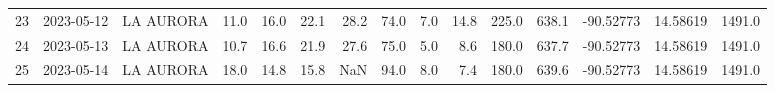 \documentclass[12pt]{article}
\begin{document}
\begin{center}
\begin{tabular}{lllrrrrrrrrrrrr}
23  & 2023-05-12 &  LA AURORA &    11.0 &  16.0 &   22.1 &  28.2 &     74.0 &  7.0 &        14.8 &       225.0 &      638.1 & -90.52773 &  14.58619 &   1491.0 \\
24  & 2023-05-13 &  LA AURORA &    10.7 &  16.6 &   21.9 &  27.6 &     75.0 &  5.0 &         8.6 &       180.0 &      637.7 & -90.52773 &  14.58619 &   1491.0 \\
25  & 2023-05-14 &  LA AURORA &    18.0 &  14.8 &   15.8 &   NaN &     94.0 &  8.0 &         7.4 &       180.0 &      639.6 & -90.52773 &  14.58619 &   1491.0 \\
\bottomrule
\end{tabular}

        
        \end{center}
        
\end{document}
